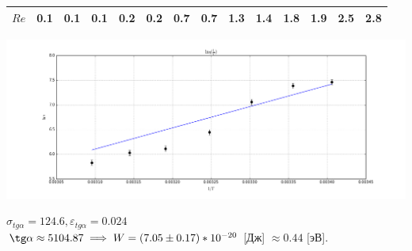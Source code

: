 \documentclass[10pt]{article}
\begin{document}
\begin{enumerate}
\begin{table}[htp]
\begin{tabular}{|c|c|c|c|c|c|c|c|c|c|c|c|c|c|}
                            \hline
                                $Re$ &0.1 &0.1 &0.1 &0.2 &0.2 &0.7 &0.7 &1.3 &1.4 &1.8 &1.9 &2.5 &2.8\\
                                \hline
                        \end{tabular}
    \end{table}
    \begin{center}
    \includegraphics[width=18cm]{g1.png} 
    \end{center}

    $\sigma_{tg \alpha} = 124.6 , \varepsilon_{tg \alpha} = 0.024$ \\
    $\tg \alpha \approx 5104.87 \implies W = (7.05 \pm 0.17)* 10^{-20}$ [Дж] $\approx 0.44$ [эВ].


\end{enumerate}
\end{document}
